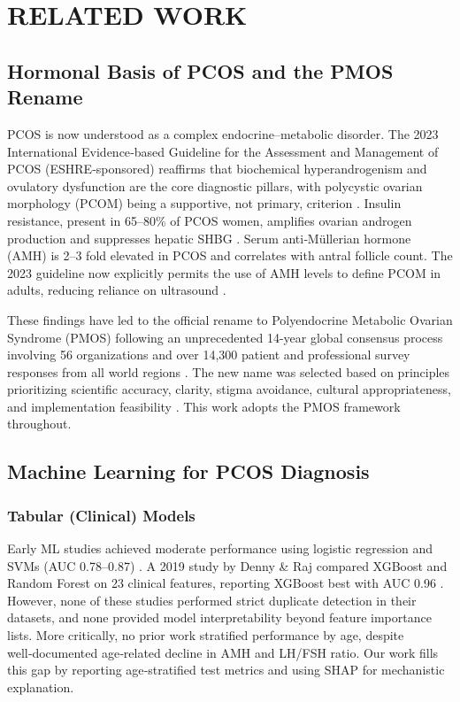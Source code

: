 \documentclass[conference]{IEEEtran}
\begin{document}
\section{RELATED WORK}

\subsection{Hormonal Basis of PCOS and the PMOS Rename}

PCOS is now understood as a complex endocrine–metabolic disorder. The 2023 International Evidence‑based Guideline for the Assessment and Management of PCOS (ESHRE‑sponsored) reaffirms that biochemical hyperandrogenism and ovulatory dysfunction are the core diagnostic pillars, with polycystic ovarian morphology (PCOM) being a supportive, not primary, criterion \cite{ESHRE2023}. Insulin resistance, present in 65–80\% of PCOS women, amplifies ovarian androgen production and suppresses hepatic SHBG \cite{Dunaif1997}. Serum anti‑Müllerian hormone (AMH) is 2–3 fold elevated in PCOS and correlates with antral follicle count. The 2023 guideline now explicitly permits the use of AMH levels to define PCOM in adults, reducing reliance on ultrasound \cite{ESHRE2023}.

These findings have led to the official rename to Polyendocrine Metabolic Ovarian Syndrome (PMOS) following an unprecedented 14-year global consensus process involving 56 organizations and over 14,300 patient and professional survey responses from all world regions \cite{TeedeLancet2026}. The new name was selected based on principles prioritizing scientific accuracy, clarity, stigma avoidance, cultural appropriateness, and implementation feasibility \cite{ContemporaryOBGYN2026}. This work adopts the PMOS framework throughout.

\subsection{Machine Learning for PCOS Diagnosis}

\subsubsection{Tabular (Clinical) Models}
Early ML studies achieved moderate performance using logistic regression and SVMs (AUC 0.78–0.87) \cite{Bharati2020}. A 2019 study by Denny \& Raj compared XGBoost and Random Forest on 23 clinical features, reporting XGBoost best with AUC 0.96 \cite{Denny2019}. However, none of these studies performed strict duplicate detection in their datasets, and none provided model interpretability beyond feature importance lists. More critically, no prior work stratified performance by age, despite well‑documented age‑related decline in AMH and LH/FSH ratio. Our work fills this gap by reporting age‑stratified test metrics and using SHAP for mechanistic explanation.
\end{document}
